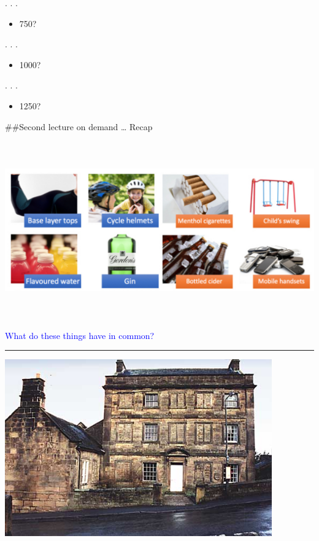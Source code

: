 \documentclass[]{article}
\providecommand{\tightlist}{%
  \setlength{\itemsep}{0pt}\setlength{\parskip}{0pt}}
\begin{document}
. . .

\begin{itemize}
\tightlist
\item
  750?
\end{itemize}

. . .

\begin{itemize}
\tightlist
\item
  1000?
\end{itemize}

. . .

\begin{itemize}
\tightlist
\item
  1250?
\end{itemize}

\#\#Second lecture on demand \ldots{} Recap

\includegraphics[height=3in]{picsfigs/ukcpi_inout.png}

\textcolor{blue}{What do these things have in common?}

\begin{center}\rule{0.5\linewidth}{\linethickness}\end{center}

\includegraphics[height=3in]{picsfigs/ukwindows.jpg}
\end{document}
